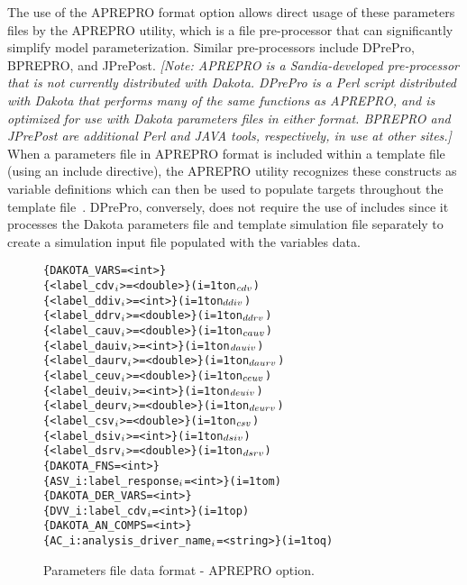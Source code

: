The use of the APREPRO format option allows direct usage of these
parameters files by the APREPRO utility, which is a file pre-processor
that can significantly simplify model parameterization.  Similar
pre-processors include DPrePro, BPREPRO, and JPrePost.  \emph{[Note:
APREPRO is a Sandia-developed pre-processor that is not currently
distributed with Dakota.  DPrePro is a Perl script distributed with
Dakota that performs many of the same functions as APREPRO, and is
optimized for use with Dakota parameters files in either format.
BPREPRO and JPrePost are additional Perl and JAVA tools, respectively,
in use at other sites.]}  When a parameters file in APREPRO format is
included within a template file (using an include directive), the
APREPRO utility recognizes these constructs as variable definitions
which can then be used to populate targets throughout the template
file~\cite{Sja92}.  DPrePro, conversely, does not require the use of
includes since it processes the Dakota parameters file and template
simulation file separately to create a simulation input file populated
with the variables data.

\begin{figure}
  \begin{bigbox}
  \centering
  \begin{alltt}
    \{ DAKOTA_VARS = <int> \}
    \{ <label_cdv\(\sb{i}\)> = <double> \}         (i = 1 to n\(\sb{cdv}\))
    \{ <label_ddiv\(\sb{i}\)> = <int> \}           (i = 1 to n\(\sb{ddiv}\))
    \{ <label_ddrv\(\sb{i}\)> = <double> \}        (i = 1 to n\(\sb{ddrv}\))
    \{ <label_cauv\(\sb{i}\)> = <double> \}        (i = 1 to n\(\sb{cauv}\))
    \{ <label_dauiv\(\sb{i}\)> = <int> \}          (i = 1 to n\(\sb{dauiv}\))
    \{ <label_daurv\(\sb{i}\)> = <double> \}       (i = 1 to n\(\sb{daurv}\))
    \{ <label_ceuv\(\sb{i}\)> = <double> \}        (i = 1 to n\(\sb{ceuv}\))
    \{ <label_deuiv\(\sb{i}\)> = <int> \}          (i = 1 to n\(\sb{deuiv}\))
    \{ <label_deurv\(\sb{i}\)> = <double> \}       (i = 1 to n\(\sb{deurv}\))
    \{ <label_csv\(\sb{i}\)> = <double> \}         (i = 1 to n\(\sb{csv}\))
    \{ <label_dsiv\(\sb{i}\)> = <int> \}           (i = 1 to n\(\sb{dsiv}\))
    \{ <label_dsrv\(\sb{i}\)> = <double> \}        (i = 1 to n\(\sb{dsrv}\)) \color{blue}
    \{ DAKOTA_FNS = <int> \}
    \{ ASV_i:label_response\(\sb{i}\) = <int> \}              (i = 1 to m) \color{red}
    \{ DAKOTA_DER_VARS = <int> \}
    \{ DVV_i:label_cdv\(\sb{i}\) = <int> \}                   (i = 1 to p) \color{green}
    \{ DAKOTA_AN_COMPS = <int> \}
    \{ AC_i:analysis_driver_name\(\sb{i}\) = <string> \}      (i = 1 to q)
  \end{alltt}
  \end{bigbox}
  \caption{Parameters file data format - APREPRO option.}
  \label{variables:figure02}
\end{figure}


